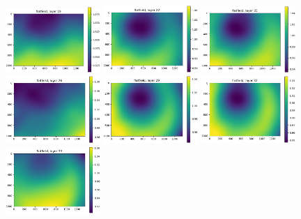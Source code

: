 \documentclass[letterpaper,11pt]{article}
\begin{document}
\begin{figure}[!ht]
\includegraphics[width=0.32\textwidth]{images/results/flatfield_layers/flatfield_layer_19}
\includegraphics[width=0.32\textwidth]{images/results/flatfield_layers/flatfield_layer_22}
\includegraphics[width=0.32\textwidth]{images/results/flatfield_layers/flatfield_layer_25}
\includegraphics[width=0.32\textwidth]{images/results/flatfield_layers/flatfield_layer_26}
\includegraphics[width=0.32\textwidth]{images/results/flatfield_layers/flatfield_layer_29}
\includegraphics[width=0.32\textwidth]{images/results/flatfield_layers/flatfield_layer_32}
\includegraphics[width=0.32\textwidth]{images/results/flatfield_layers/flatfield_layer_33}

\end{figure}
\end{document}
